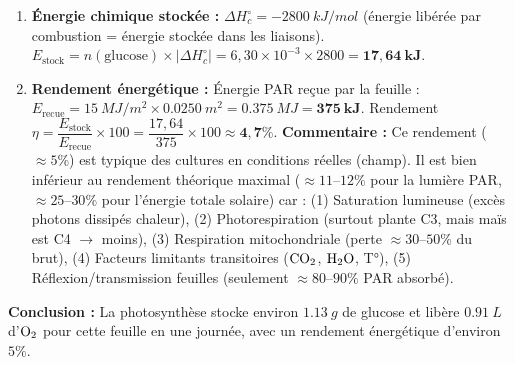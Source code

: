 \documentclass[11pt]{article}
\begin{document}
\begin{exoresolu}
\begin{enumerate}
            $n(\ce{O2}) = n(\ce{CO2}) = 3,78 \times 10^{-2}\ \text{mol}$ (coefficients 6:6).
            $V(\ce{O2}) = n \times V_m = 3,78 \times 10^{-2} \times 24,0 = \mathbf{0,907\ \text{L}}$ (soit $\approx \SI{907}{mL}$).
        \item \textbf{Énergie chimique stockée :}
            $\Delta H_c^\circ = -\SI{2800}{kJ/mol}$ (énergie libérée par combustion = énergie stockée dans les liaisons).
            $E_{\text{stock}} = n(\text{glucose}) \times |\Delta H_c^\circ| = 6,30 \times 10^{-3} \times 2800 = \mathbf{17,64\ \text{kJ}}$.
        \item \textbf{Rendement énergétique :}
            Énergie PAR reçue par la feuille : $E_{\text{recue}} = \SI{15}{MJ/m^2} \times \SI{0,0250}{m^2} = \SI{0,375}{MJ} = \mathbf{375\ \text{kJ}}$.
            Rendement $\eta = \dfrac{E_{\text{stock}}}{E_{\text{recue}}} \times 100 = \dfrac{17,64}{375} \times 100 \approx \mathbf{4,7\%}$.
            \textbf{Commentaire :} Ce rendement ($\approx 5\%$) est typique des cultures en conditions réelles (champ). Il est bien inférieur au rendement théorique maximal ($\approx 11$--$12\%$ pour la lumière PAR, $\approx 25$--$30\%$ pour l'énergie totale solaire) car : (1) Saturation lumineuse (excès photons dissipés chaleur), (2) Photorespiration (surtout plante C3, mais maïs est C4 $\rightarrow$ moins), (3) Respiration mitochondriale (perte $\approx 30$--$50\%$ du brut), (4) Facteurs limitants transitoires ($\ce{CO2}$, $\ce{H2O}$, T°), (5) Réflexion/transmission feuilles (seulement $\approx 80$--$90\%$ PAR absorbé).
    \end{enumerate}
    \textbf{Conclusion :} La photosynthèse stocke environ $\SI{1,13}{g}$ de glucose et libère $\SI{0,91}{L}$ d'$\ce{O2}$ pour cette feuille en une journée, avec un rendement énergétique d'environ $5\%$.
\end{exoresolu}
\end{document}
